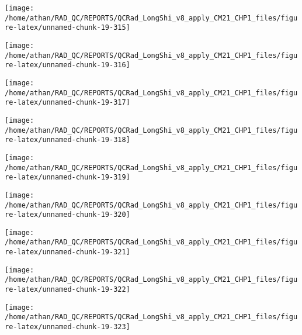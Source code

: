 \documentclass[
  10pt,
  a4paper,oneside]{article}
\begin{document}
\begin{center}\texttt{[image: /home/athan/RAD\_QC/REPORTS/QCRad\_LongShi\_v8\_apply\_CM21\_CHP1\_files/figure-latex/unnamed-chunk-19-315]} \end{center}

\begin{center}\texttt{[image: /home/athan/RAD\_QC/REPORTS/QCRad\_LongShi\_v8\_apply\_CM21\_CHP1\_files/figure-latex/unnamed-chunk-19-316]} \end{center}

\begin{center}\texttt{[image: /home/athan/RAD\_QC/REPORTS/QCRad\_LongShi\_v8\_apply\_CM21\_CHP1\_files/figure-latex/unnamed-chunk-19-317]} \end{center}

\begin{center}\texttt{[image: /home/athan/RAD\_QC/REPORTS/QCRad\_LongShi\_v8\_apply\_CM21\_CHP1\_files/figure-latex/unnamed-chunk-19-318]} \end{center}

\begin{center}\texttt{[image: /home/athan/RAD\_QC/REPORTS/QCRad\_LongShi\_v8\_apply\_CM21\_CHP1\_files/figure-latex/unnamed-chunk-19-319]} \end{center}

\begin{center}\texttt{[image: /home/athan/RAD\_QC/REPORTS/QCRad\_LongShi\_v8\_apply\_CM21\_CHP1\_files/figure-latex/unnamed-chunk-19-320]} \end{center}

\begin{center}\texttt{[image: /home/athan/RAD\_QC/REPORTS/QCRad\_LongShi\_v8\_apply\_CM21\_CHP1\_files/figure-latex/unnamed-chunk-19-321]} \end{center}

\begin{center}\texttt{[image: /home/athan/RAD\_QC/REPORTS/QCRad\_LongShi\_v8\_apply\_CM21\_CHP1\_files/figure-latex/unnamed-chunk-19-322]} \end{center}

\begin{center}\texttt{[image: /home/athan/RAD\_QC/REPORTS/QCRad\_LongShi\_v8\_apply\_CM21\_CHP1\_files/figure-latex/unnamed-chunk-19-323]} \end{center}
\end{document}
